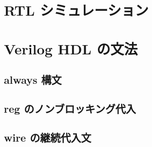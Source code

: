 \section{RTL シミュレーション}

\section{Verilog HDL の文法}

\subsection{always 構文}

\subsection{reg のノンブロッキング代入}

\subsection{wire の継続代入文}

